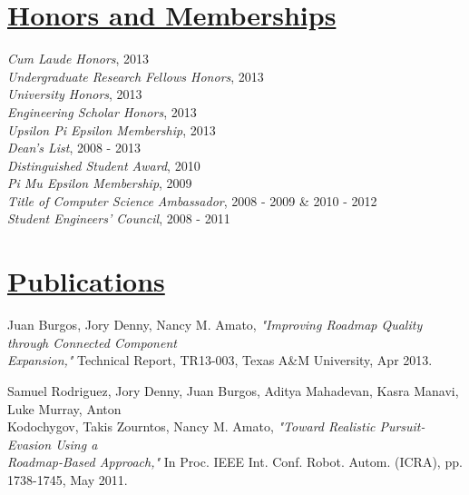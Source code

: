 \documentclass[8pt]{res}
\begin{document}
\begin{resume}

    \section{\underline{Honors and Memberships}}          
    \vspace{+0.02in}	
    \emph{Cum Laude Honors}, 2013 \\
    \emph{Undergraduate Research Fellows Honors}, 2013 \\
    \emph{University Honors}, 2013 \\
    \emph{Engineering Scholar Honors}, 2013 \\
    \emph{Upsilon Pi Epsilon Membership}, 2013 \\
    \emph{Dean's List}, 2008 - 2013 \\
    \emph{Distinguished Student Award}, 2010 \\
    \emph{Pi Mu Epsilon Membership}, 2009 \\
    \emph{Title of Computer Science Ambassador}, 2008 - 2009 \& 2010 - 2012 \\
    \emph{Student Engineers' Council}, 2008 - 2011 \\
    \vspace{-0.1in}	


    \section{\underline{Publications}}
    Juan Burgos, Jory Denny, Nancy M. Amato, \emph{"Improving Roadmap Quality through Connected Component \\
    Expansion,"} Technical Report, TR13-003, Texas A\&M University, Apr 2013.

    Samuel Rodriguez, Jory Denny, Juan Burgos, Aditya Mahadevan, Kasra Manavi, Luke Murray, Anton \\
    Kodochygov, Takis Zourntos, Nancy M. Amato, \emph{"Toward Realistic Pursuit-Evasion Using a \\
    Roadmap-Based Approach,"} In Proc. IEEE Int. Conf. Robot. Autom. (ICRA), pp. 1738-1745, May 2011. 


\end{resume}
\end{document}
